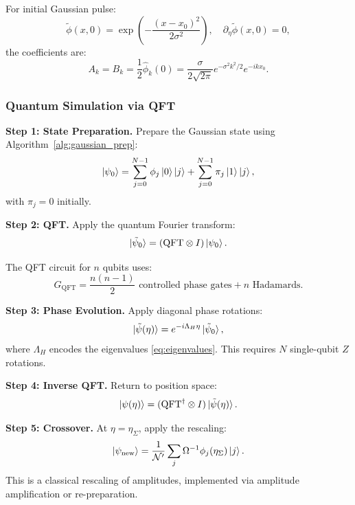 \documentclass[11pt,a4paper]{article}
\theoremstyle{plain}
\theoremstyle{definition}
\theoremstyle{remark}
\begin{document}
For initial Gaussian pulse:
\begin{equation}
    \tilde{\phi}(x, 0) = \exp\left(-\frac{(x-x_0)^2}{2\sigma^2}\right), \quad \partial_\eta\tilde{\phi}(x,0) = 0,
\end{equation}
the coefficients are:
\begin{equation}
    A_k = B_k = \frac{1}{2}\hat{\phi}_k(0) = \frac{\sigma}{2\sqrt{2\pi}} e^{-\sigma^2 k^2/2} e^{-ikx_0}.
\end{equation}

\subsubsection{Quantum Simulation via QFT}

\textbf{Step 1: State Preparation.} Prepare the Gaussian state using Algorithm~\ref{alg:gaussian_prep}:
\begin{equation}
    \ket{\psi_0} = \sum_{j=0}^{N-1} \phi_j \ket{0}\ket{j} + \sum_{j=0}^{N-1} \pi_j \ket{1}\ket{j},
\end{equation}
with $\pi_j = 0$ initially.

\textbf{Step 2: QFT.} Apply the quantum Fourier transform:
\begin{equation}
    \ket{\tilde{\psi}_0} = (\mathrm{QFT} \otimes I)\ket{\psi_0}.
\end{equation}

The QFT circuit for $n$ qubits uses:
\begin{equation}
    G_{\mathrm{QFT}} = \frac{n(n-1)}{2} \text{ controlled phase gates} + n \text{ Hadamards}.
\end{equation}

\textbf{Step 3: Phase Evolution.} Apply diagonal phase rotations:
\begin{equation}
    \ket{\tilde{\psi}(\eta)} = e^{-i\Lambda_H \eta}\ket{\tilde{\psi}_0},
\end{equation}
where $\Lambda_H$ encodes the eigenvalues \eqref{eq:eigenvalues}. This requires $N$ single-qubit $Z$ rotations.

\textbf{Step 4: Inverse QFT.} Return to position space:
\begin{equation}
    \ket{\psi(\eta)} = (\mathrm{QFT}^\dagger \otimes I)\ket{\tilde{\psi}(\eta)}.
\end{equation}

\textbf{Step 5: Crossover.} At $\eta = \eta_\Sigma$, apply the rescaling:
\begin{equation}
    \ket{\psi_{\text{new}}} = \frac{1}{\mathcal{N}'} \sum_j \Omega^{-1} \phi_j(\eta_\Sigma) \ket{j}.
\end{equation}
This is a classical rescaling of amplitudes, implemented via amplitude amplification or re-preparation.
\end{document}
